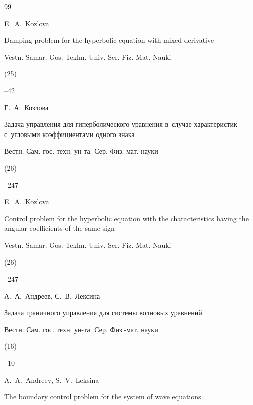 \begin{thebibliography}{99}

\misctransl

\by E.~A.~Kozlova

\paper Damping problem for the hyperbolic equation with mixed derivative

\jour Vestn. Samar. Gos. Tekhn. Univ. Ser. Fiz.-Mat. Nauki


(25)

--42




\by Е.~А.~Козлова

\paper Задача управления для гиперболического уравнения в~случае характеристик с~угловыми коэффициентами одного знака

\jour Вестн. Сам. гос. техн. ун-та. Сер. Физ.-мат. науки


(26)

--247


\misctransl

\by E.~A.~Kozlova

\paper Control problem for the hyperbolic equation with the characteristics having the angular coefficients of the same sign

\jour Vestn. Samar. Gos. Tekhn. Univ. Ser. Fiz.-Mat. Nauki


(26)

--247






\by А.~А.~Андреев, С.~В.~Лексина

\paper Задача граничного управления для системы волновых уравнений

\jour Вестн. Сам. гос. техн. ун-та. Сер. Физ.-мат. науки


(16)

--10


\misctransl

\by A.~A.~Andreev, S.~V.~Leksina

\paper The boundary control problem for the system of wave equations


\end{thebibliography}
